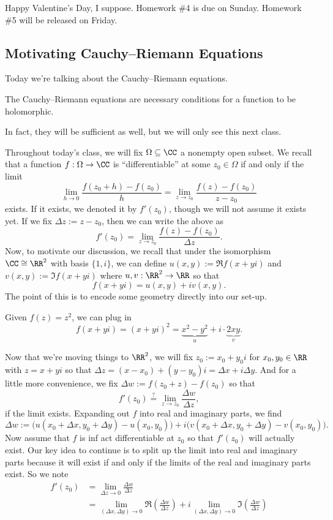 
Happy Valentine's Day, I suppose. Homework \#4 is due on Sunday. Homework \#5 will be released on Friday.

\subsection{Motivating Cauchy--Riemann Equations}
Today we're talking about the Cauchy--Riemann equations.
\begin{idea}
	The Cauchy--Riemann equations are necessary conditions for a function to be holomorphic.
\end{idea}
In fact, they will be sufficient as well, but we will only see this next class.

Throughout today's class, we will fix $\Omega\subseteq\CC$ a nonempty open subset. We recall that a function $f:\Omega\to\CC$ is ``differentiable'' at some $z_0\in\Omega$ if and only if the limit
\[\lim_{h\to0}\frac{f(z_0+h)-f(z_0)}{h}=\lim_{z\to z_0}\frac{f(z)-f(z_0)}{z-z_0}\]
exists. If it exists, we denoted it by $f'(z_0)$, though we will not assume it exists yet. If we fix $\Delta z:=z-z_0$, then we can write the above as
\[f'(z_0)=\lim_{z\to z_0}\frac{f(z)-f(z_0)}{\Delta z}.\]
Now, to motivate our discussion, we recall that under the isomorphism $\CC\cong\RR^2$ with basis $\{1,i\}$, we can define $u(x,y):=\Re f(x+yi)$ and $v(x,y):=\Im f(x+yi)$ where $u,v:\RR^2\to\RR$ so that
\[f(x+yi)=u(x,y)+iv(x,y).\]
The point of this is to encode some geometry directly into our set-up.
\begin{example}
	Given $f(z)=z^2$, we can plug in
	\[f(x+yi)=(x+yi)^2=\underbrace{x^2-y^2}_u+i\cdot\underbrace{2xy}_v.\]
\end{example}
Now that we're moving things to $\RR^2$, we will fix $z_0:=x_0+y_0i$ for $x_0,y_0\in\RR$ with $z=x+yi$ so that $\Delta z=(x-x_0)+(y-y_0)i=\Delta x+i\Delta y$. And for a little more convenience, we fix $\Delta w:=f(z_0+z)-f(z_0)$ so that
\[f'(z_0)\stackrel?=\lim_{z\to z_0}\frac{\Delta w}{\Delta z},\]
if the limit exists. Expanding out $f$ into real and imaginary parts, we find
\[\Delta w := \big(u(x_0+\Delta x,y_0+\Delta y)-u(x_0,y_0)\big) + i\big(v(x_0+\Delta x,y_0+\Delta y)-v(x_0,y_0)\big).\]
Now assume that $f$ is inf act differentiable at $z_0$ so that $f'(z_0)$ will actually exist. Our key idea to continue is to split up the limit into real and imaginary parts because it will exist if and only if the limits of the real and imaginary parts exist. So we note
\begin{align*}
	f'(z_0) &= \lim_{\Delta z\to0}\frac{\Delta w}{\Delta z} \\
	&= \lim_{(\Delta x,\Delta y)\to0}\Re\left(\frac{\Delta w}{\Delta z}\right)+i \lim_{(\Delta x,\Delta y)\to0}\Im\left(\frac{\Delta w}{\Delta z}\right) \tag{$*$}\label{eq:almostcauchyriemann}
\end{align*}
